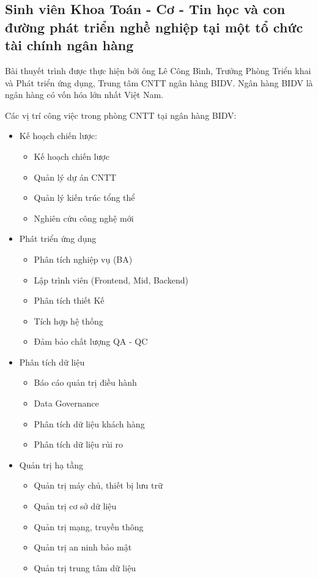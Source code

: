 \documentclass[14pt, a4paper]{article}
\numberwithin{equation}{section}
\numberwithin{figure}{section}
\numberwithin{dl}{section}
\numberwithin{md}{section}
\numberwithin{bd}{section}
\numberwithin{dn}{section}
\numberwithin{hq}{section}
\begin{document}
    \subsection{Sinh viên Khoa Toán - Cơ - Tin học và con đường phát triển nghề nghiệp tại một tổ chức tài chính ngân hàng}
    
    Bài thuyết trình được thực hiện bởi ông Lê Công Bình, Trưởng Phòng Triển khai và Phát triển ứng dụng, Trung tâm CNTT ngân hàng BIDV.
    Ngân hàng BIDV là ngân hàng có vốn hóa lớn nhất Việt Nam.

    Các vị trí công việc trong phòng CNTT tại ngân hàng BIDV:

    \begin{itemize}
        \item Kế hoạch chiến lược:
        \begin{itemize}
            \item Kế hoạch chiến lược
            \item Quản lý dự án CNTT
            \item Quản lý kiến trúc tổng thể
            \item Nghiên cứu công nghệ mới
        \end{itemize}
        \item Phát triển ứng dụng
        \begin{itemize}
            \item Phân tích nghiệp vụ (BA)
            \item Lập trình viên (Frontend, Mid, Backend)
            \item Phân tích thiết Kế
            \item Tích hợp hệ thống
            \item Đảm bảo chất lượng QA - QC
        \end{itemize}
        \item Phân tích dữ liệu
        \begin{itemize}
            \item Báo cáo quản trị điều hành
            \item Data Governance
            \item Phân tích dữ liệu khách hàng
            \item Phân tích dữ liệu rủi ro
        \end{itemize}
        \item Quản trị hạ tầng
        \begin{itemize}
            \item Quản trị máy chủ, thiết bị lưu trữ
            \item Quản trị cơ sở dữ liệu
            \item Quản trị mạng, truyền thông
            \item Quản trị an ninh bảo mật
            \item Quản trị trung tâm dữ liệu
        \end{itemize}
    \end{itemize}
\end{document}
